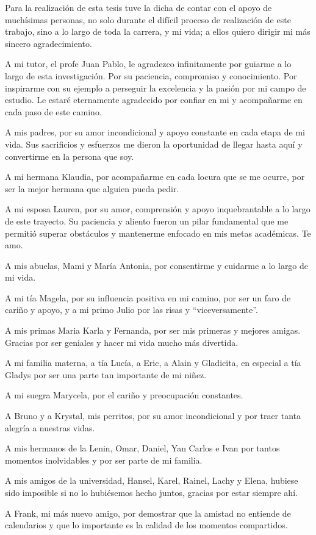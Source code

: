 \begin{acknowledgements}
    Para la realizaci\'on de esta tesis tuve la dicha de contar con el apoyo de much\'isimas personas, no solo durante
    el dif\'icil proceso de realizaci\'on de este trabajo, sino a lo largo de toda la carrera, y mi vida; a ellos quiero
    dirigir mi m\'as sincero agradecimiento.

    A mi tutor, el profe Juan Pablo, le agradezco infinitamente por guiarme a lo largo de esta investigaci\'on.
    Por su paciencia, compromiso y conocimiento. Por inspirarme con su ejemplo a perseguir la excelencia y la pasi\'on 
    por mi campo de estudio. Le estar\'e eternamente agradecido por confiar en mi y acompa\~narme en cada paso de este camino.

    A mis padres, por su amor incondicional y apoyo constante en cada etapa de mi vida. Sus sacrificios y esfuerzos me dieron la 
    oportunidad de llegar hasta aqu\'i y convertirme en la persona que soy.

    A mi hermana Klaudia, por acompa\~narme en cada locura que se me ocurre, por ser la mejor hermana que alguien pueda pedir.

    A mi esposa Lauren, por su amor, comprensi\'on y apoyo inquebrantable a lo largo de este trayecto. Su paciencia y aliento fueron 
    un pilar fundamental que me permiti\'o superar obst\'aculos y mantenerme enfocado en mis metas acad\'emicas. Te amo.

    A mis abuelas, Mami y Mar\'ia Antonia, por consentirme y cuidarme a lo largo de mi vida. 

    A mi t\'ia Magela, por su influencia positiva en mi camino, por ser un faro de cari\~no y apoyo, y a mi primo Julio por las risas y ``viceversamente''.
    
    A mis primas Maria Karla y Fernanda, por ser mis primeras y mejores amigas. Gracias por ser geniales y hacer mi vida mucho más divertida.

    A mi familia materna, a t\'ia Luc\'ia, a Eric, a Alain y Gladicita, en especial a t\'ia Gladys por ser una parte tan importante de mi ni\~nez.

    A mi suegra Marycela, por el cari\~no y preocupaci\'on constantes.

    A Bruno y a Krystal, mis perritos, por su amor incondicional y por traer tanta alegr\'ia a nuestras vidas.

    A mis hermanos de la Lenin, Omar, Daniel, Yan Carlos e Ivan por tantos momentos inolvidables y por ser parte de mi familia.

    A mis amigos de la universidad, Hansel, Karel, Rainel, Lachy y Elena, hubiese sido imposible si no lo hubi\'esemos hecho juntos, gracias por estar
    siempre ah\'i.

    A Frank, mi m\'as nuevo amigo, por demostrar que la amistad no entiende de calendarios y que lo importante es la calidad de los momentos compartidos.
    


    








\end{acknowledgements}